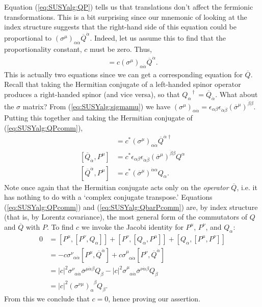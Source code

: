 \documentclass[12pt, oneside]{report}    %
\begin{document}
Equation (\ref{eq:SUSYalg:QP}) tells us that translations don't affect the fermionic transformations. This is a bit surprising since our mnemonic of looking at the index structure suggests that the right-hand side of this equation could be proportional to $(\sigma^\mu)_{\alpha\dot\alpha}\overline Q^{\dot\alpha}$. Indeed, let us assume this to find that the proportionality constant, $c$ must be zero. Thus,
\begin{align}
    [Q_\alpha,P^\mu] = c(\sigma^\mu)_{\alpha\dot\alpha}\overline Q^{\dot\alpha}.\label{eq:SUSYalg:QPcomm}
\end{align}
This is actually two equations since we can get a corresponding equation for $\overline Q$.
%
Recall that taking the Hermitian conjugate of a left-handed spinor operator produces a right-handed spinor (and vice versa), so that $Q_\alpha^{\phantom\alpha\dag} = \overline Q_{\dot\alpha}$. What about the $\sigma$ matrix?
%
From  (\ref{eq:SUSYalg:sigmamu}) we have $(\sigma^\mu)_{\alpha\dot\alpha} = \epsilon_{\alpha\beta}\epsilon_{\dot\alpha\dot\beta}(\overline\sigma^\mu)^{\dot\beta\beta}$. Putting this together and taking the Hermitian conjugate of  (\ref{eq:SUSYalg:QPcomm}),
\begin{align}
    [Q_{\alpha}^{\phantom\alpha\dag},P^\mu] &= c^* (\sigma^\mu)_{\alpha\dot\alpha}\overline Q^{\dot\alpha\dag}\\
    [\overline Q_{\dot\alpha},P^\mu] &= c^* \epsilon_{\alpha\beta}\epsilon_{\dot\alpha\dot\beta}(\overline\sigma^\mu)^{\dot\beta\beta} Q^{\alpha}\\
    [\overline Q^{\dot\alpha},P^\mu] &= c^*(\overline\sigma^\mu)^{\dot\alpha\alpha} Q_{\alpha}.\label{eq:SUSYalg:QbarPcomm}
\end{align}
Note once again that the Hermitian conjugate acts only on the \textit{operator} $\overline Q$, i.e. it has nothing to do with a `complex conjugate transpose.' Equations (\ref{eq:SUSYalg:QPcomm}) and (\ref{eq:SUSYalg:QbarPcomm}) are, by index structure (that is, by Lorentz covariance), the most general form of the commutators of $Q$ and $\overline Q$ with $P$. To find $c$ we invoke the Jacobi identity for $P^\mu$, $P^\nu$, and $Q_\alpha$:
\begin{align}
    0 &= \left[P^\mu,\left[P^\nu,Q_\alpha\right]\right] + \left[P^\nu,\left[Q_\alpha,P^\mu\right]\right] + \left[Q_\alpha,\left[P^\mu,P^\nu\right]\right]\\
    &= -c\sigma^{\nu}_{\phantom\nu\alpha\dot\alpha} \left[P^\mu,\overline Q^{\dot\alpha}\right] + c\sigma^\mu_{\phantom\mu\alpha\dot\alpha}\left[P^\nu,\overline Q^{\dot\alpha}\right]\\
    &= \left|c\right|^2 \sigma^\nu_{\phantom\nu\alpha\dot\alpha} \overline\sigma^{\mu\dot\alpha\beta}Q_\beta - \left|c\right|^2 \sigma^\mu_{\phantom\mu\alpha\dot\alpha} \overline\sigma^{\nu\dot\alpha\beta}Q_\beta\\
    &= \left|c\right|^2 (\sigma^{\nu\mu})_\alpha^{\phantom\alpha\beta}Q_\beta.
\end{align}
From this we conclude that $c=0$, hence proving our assertion.
\end{document}
